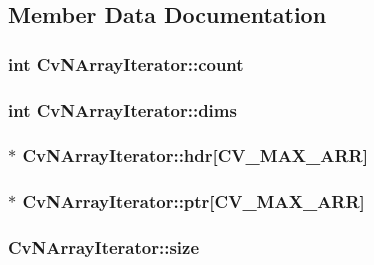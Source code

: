 \subsection{Member Data Documentation}
\hypertarget{structCvNArrayIterator_aa6d032dc0befd446f1281bf99f9554d1}{
\subsubsection[{count}]{\setlength{\rightskip}{0pt plus 5cm}int Cv\-N\-Array\-Iterator\-::count}}\label{structCvNArrayIterator_aa6d032dc0befd446f1281bf99f9554d1}
\hypertarget{structCvNArrayIterator_ad57960a049d73d9c51ed4aea6af1fa02}{
\subsubsection[{dims}]{\setlength{\rightskip}{0pt plus 5cm}int Cv\-N\-Array\-Iterator\-::dims}}\label{structCvNArrayIterator_ad57960a049d73d9c51ed4aea6af1fa02}
\hypertarget{structCvNArrayIterator_adb073235c36991f2eeb912225c89faaf}{
\subsubsection[{hdr}]{$\ast$ Cv\-N\-Array\-Iterator\-::hdr\mbox{[}{\bf C\-V\-\_\-\-M\-A\-X\-\_\-\-A\-R\-R}\mbox{]}}}\label{structCvNArrayIterator_adb073235c36991f2eeb912225c89faaf}
\hypertarget{structCvNArrayIterator_aeab4b868c639d6c41630fbf37b75c95e}{
\subsubsection[{ptr}]{$\ast$ Cv\-N\-Array\-Iterator\-::ptr\mbox{[}{\bf C\-V\-\_\-\-M\-A\-X\-\_\-\-A\-R\-R}\mbox{]}}}\label{structCvNArrayIterator_aeab4b868c639d6c41630fbf37b75c95e}
\hypertarget{structCvNArrayIterator_a9cc7aac6cb3f3d6d3645722c8509f223}{
\subsubsection[{size}]{ Cv\-N\-Array\-Iterator\-::size}}\label{structCvNArrayIterator_a9cc7aac6cb3f3d6d3645722c8509f223}
